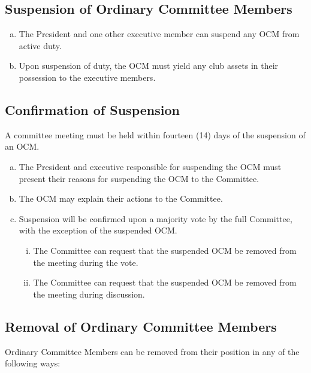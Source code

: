 \documentclass[a4paper,12pt]{article}
\begin{document}
\subsection{Suspension of Ordinary Committee Members}

\begin{enumerate}[a)]
	\item The President and one other executive member can suspend any OCM from active duty.
	\item Upon suspension of duty, the OCM must yield any club assets in their possession to the executive members.
\end{enumerate}

\subsection{Confirmation of Suspension}

A committee meeting must be held within fourteen (14) days of the suspension of an OCM.

\begin{enumerate}[a)]
	\item The President and executive responsible for suspending the OCM must present their reasons for suspending the OCM to the Committee.
	\item The OCM may explain their actions to the Committee.
	\item Suspension will be confirmed upon a majority vote by the full Committee, with the exception of the suspended OCM.
	\begin{enumerate}[i)]
		\item The Committee can request that the suspended OCM be removed from the meeting during the vote.
		\item The Committee can request that the suspended OCM be removed from the meeting during discussion.
	\end{enumerate}
\end{enumerate}

\subsection{Removal of Ordinary Committee Members}

Ordinary Committee Members can be removed from their position in any of the following ways:
\end{document}
